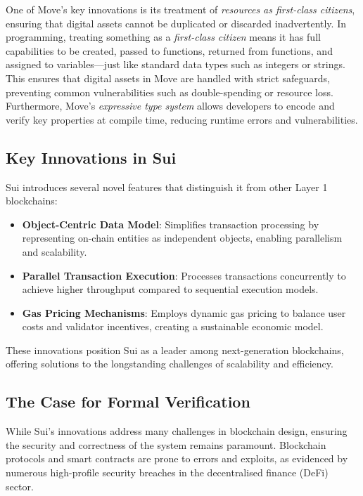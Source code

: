 \documentclass[english, 12pt, a4paper, biz, utf8, a-2b, online]{aaltothesis}
\begin{document}
One of Move's key innovations is its treatment of \emph{resources as first-class citizens}, ensuring that digital assets cannot be duplicated or discarded inadvertently. In programming, treating something as a \emph{first-class citizen} means it has full capabilities to be created, passed to functions, returned from functions, and assigned to variables—just like standard data types such as integers or strings. This ensures that digital assets in Move are handled with strict safeguards, preventing common vulnerabilities such as double-spending or resource loss. Furthermore, Move's \emph{expressive type system} allows developers to encode and verify key properties at compile time, reducing runtime errors and vulnerabilities.

\subsection{Key Innovations in Sui}
Sui introduces several novel features that distinguish it from other Layer 1 blockchains:
\begin{itemize}
    \item \textbf{Object-Centric Data Model}: Simplifies transaction processing by representing on-chain entities as independent objects, enabling parallelism and scalability.
    \item \textbf{Parallel Transaction Execution}: Processes transactions concurrently to achieve higher throughput compared to sequential execution models.
    \item \textbf{Gas Pricing Mechanisms}: Employs dynamic gas pricing to balance user costs and validator incentives, creating a sustainable economic model.~\cite{sui_fees}
\end{itemize}

These innovations position Sui as a leader among next-generation blockchains, offering solutions to the longstanding challenges of scalability and efficiency.

\subsection{The Case for Formal Verification}
While Sui's innovations address many challenges in blockchain design, ensuring the security and correctness of the system remains paramount. Blockchain protocols and smart contracts are prone to errors and exploits, as evidenced by numerous high-profile security breaches in the decentralised finance (DeFi) sector.~\cite{phalcon_explorer}~\cite{rekt}
\end{document}
